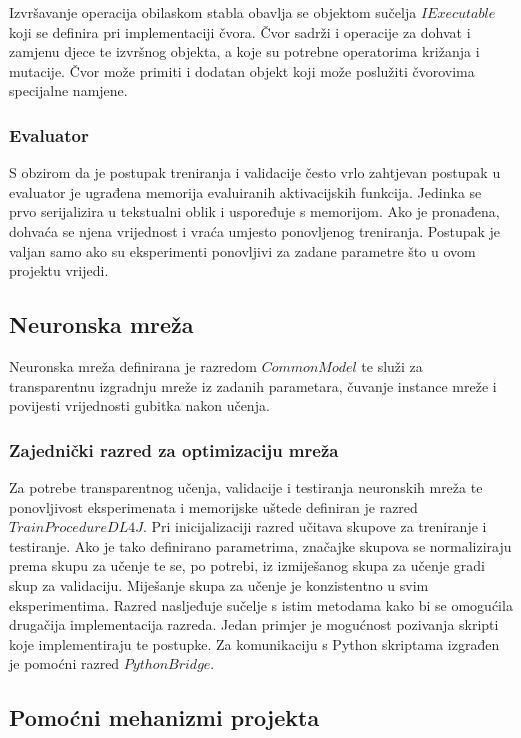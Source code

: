 \documentclass[times, utf8, numeric, diplomski]{fer}
\begin{document}
Izvršavanje operacija obilaskom stabla obavlja se objektom sučelja $IExecutable$ koji se definira pri implementaciji čvora. Čvor sadrži i operacije za dohvat i zamjenu djece te izvršnog objekta, a koje su potrebne operatorima križanja i mutacije. Čvor može primiti i dodatan objekt koji može poslužiti čvorovima specijalne namjene.

\subsubsection{Evaluator}
S obzirom da je postupak treniranja i validacije često vrlo zahtjevan postupak u evaluator je ugrađena memorija evaluiranih aktivacijskih funkcija. Jedinka se prvo serijalizira u tekstualni oblik i uspoređuje s memorijom. Ako je pronađena, dohvaća se njena vrijednost i vraća umjesto ponovljenog treniranja. Postupak je valjan samo ako su eksperimenti ponovljivi za zadane parametre što u ovom projektu vrijedi.

\subsection{Neuronska mreža}
Neuronska mreža definirana je razredom $CommonModel$ te služi za transparentnu izgradnju mreže iz zadanih parametara, čuvanje instance mreže i povijesti vrijednosti gubitka nakon učenja.

\subsubsection{Zajednički razred za optimizaciju mreža}
Za potrebe transparentnog učenja, validacije i testiranja neuronskih mreža te ponovljivost eksperimenata i memorijske uštede definiran je razred $TrainProcedureDL4J$. Pri inicijalizaciji razred učitava skupove za treniranje i testiranje. Ako je tako definirano parametrima, značajke skupova se normaliziraju prema skupu za učenje te se, po potrebi, iz izmiješanog skupa za učenje gradi skup za validaciju. Miješanje skupa za učenje je konzistentno u svim eksperimentima.
Razred nasljeđuje sučelje s istim metodama kako bi se omogućila drugačija implementacija razreda. Jedan primjer je mogućnost pozivanja skripti koje implementiraju te postupke. Za komunikaciju s Python skriptama izgrađen je pomoćni razred $PythonBridge$.

\subsection{Pomoćni mehanizmi projekta}
\end{document}
